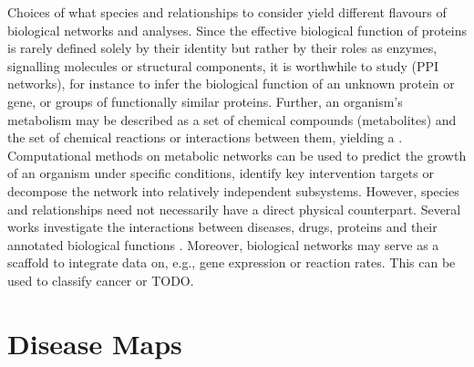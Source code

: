 \documentclass[
	fontsize=10pt, %
	twoside=false, %
	secnumdepth=1, %
]{kaobook}
\begin{document}
Choices of what species and relationships to consider yield different flavours
of biological networks and analyses. Since the effective biological function of
proteins is rarely defined solely by their identity but rather by their roles as
enzymes, signalling molecules or structural components, it is worthwhile to
study  (\textsc{PPI} networks), for
instance to infer the biological function of an unknown protein or gene, or
groups of functionally similar proteins.
Further, an organism's metabolism may
be described as a set of chemical compounds (metabolites) and the set of
chemical reactions or interactions between them, yielding a . Computational methods on metabolic networks can be used to predict the
growth of an organism under specific conditions, identify key intervention
targets or decompose the network into relatively independent subsystems.
However, species and relationships need not necessarily have a direct physical
counterpart. Several works investigate the interactions between diseases, drugs,
proteins and their annotated biological functions
\cite{ruiz_identification_2021} \cite{barabasi_NetworkMedicineNetworkbased_2011}.
Moreover, biological networks may serve as a scaffold to integrate data on,
e.g., gene expression or reaction rates. This can be used to classify cancer
or TODO.

\section{Disease Maps}
\end{document}
